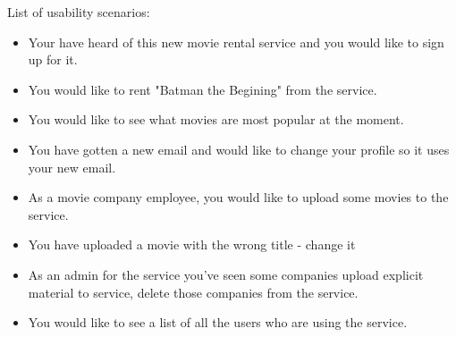 List of usability scenarios:
\begin{itemize}\addtolength{\itemsep}{-5pt}
\item Your have heard of this new movie rental service and you would like to sign up for it.
\item You would like to rent "Batman the Begining" from the service.
\item You would like to see what movies are most popular at the moment.
\item You have gotten a new email and would like to change your profile so it uses your new email.
\item As a movie company employee, you would like to upload some movies to the service.
\item You have uploaded a movie with the wrong title - change it
\item As an admin for the service you've seen some companies upload explicit material to service, delete those companies from the service.
\item You would like to see a list of all the users who are using the service.
\end {itemize}

